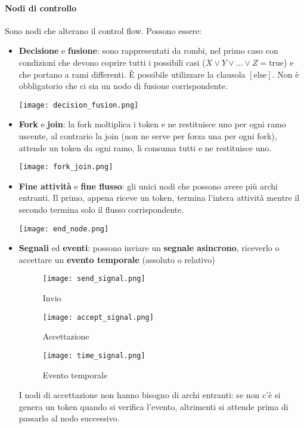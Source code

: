 \paragraph{Nodi di controllo} Sono nodi che alterano il control flow. Possono essere:
\begin{itemize}
	\item \textbf{Decisione} e \textbf{fusione}: sono rappresentati da rombi, nel primo caso con condizioni che devono coprire tutti i possibili casi ($X \lor Y \lor \ldots \lor Z = \text{true}$) e che portano a rami differenti. È possibile utilizzare la clausola \textit{$[\text{else}]$}. Non è obbligatorio che ci sia un nodo di fusione corrispondente.
	\begin{center}
		\texttt{[image: decision\_fusion.png]}
	\end{center}
	\item \textbf{Fork} e \textbf{join}: la fork moltiplica i token e ne restituisce uno per ogni ramo uscente, al contrario la join (non ne serve per forza una per ogni fork), attende un token da ogni ramo, li consuma tutti e ne restituisce uno.
	\begin{center}
		\texttt{[image: fork\_join.png]}
	\end{center}
	\item \textbf{Fine attività} e \textbf{fine flusso}: gli unici nodi che possono avere più archi entranti. Il primo, appena riceve un token, termina l'intera attività mentre il secondo termina solo il flusso corrispondente.
	\begin{center}
		\texttt{[image: end\_node.png]}
	\end{center}
	\newpage
	\item \textbf{Segnali} ed \textbf{eventi}: possono inviare un \textbf{segnale asincrono}, riceverlo o accettare un \textbf{evento temporale} (assoluto o relativo)
	\begin{figure}[!h]
		\centering
		\begin{minipage}[b]{0.2\textwidth}
			\texttt{[image: send\_signal.png]}
			\caption*{Invio}
		\end{minipage}
		\hspace{0.1\textwidth}
		\begin{minipage}[b]{0.2\textwidth}
			\texttt{[image: accept\_signal.png]}
			\caption*{Accettazione}
		\end{minipage}
		\hspace{0.1\textwidth}
		\begin{minipage}[b]{0.2\textwidth}
			\texttt{[image: time\_signal.png]}
			\caption*{Evento temporale}
		\end{minipage}
	\end{figure}
	I nodi di accettazione non hanno bisogno di archi entranti: se non c'è si genera un token quando si verifica l'evento, altrimenti si attende prima di passarlo al nodo successivo.
\end{itemize}

